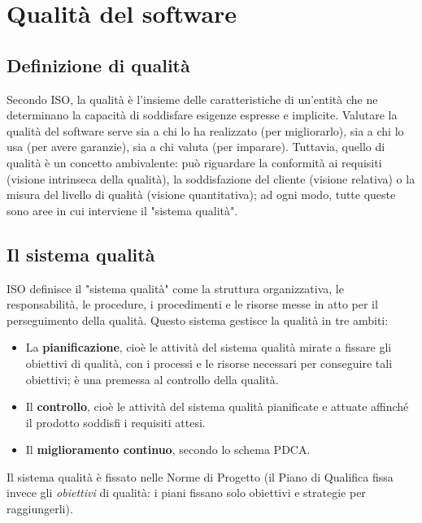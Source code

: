 \documentclass[a4paper]{article}
\begin{document}
		
	\section{Qualità del software}


		
	\subsection{Definizione di qualità}

		
Secondo ISO, la qualità è l'insieme delle caratteristiche di un'entità che ne determinano la capacità di soddisfare esigenze espresse e implicite. Valutare la qualità del software serve sia a chi lo ha realizzato (per migliorarlo), sia a chi lo usa (per avere garanzie), sia a chi valuta (per imparare). Tuttavia, quello di qualità è un concetto ambivalente: può riguardare la conformità ai requisiti (visione intrinseca della qualità), la soddisfazione del cliente (visione relativa) o la misura del livello di qualità (visione quantitativa); ad ogni modo, tutte queste sono aree in cui interviene il "sistema qualità".

		
	\subsection{Il sistema qualità}

		
ISO definisce il "sistema qualità" come la struttura organizzativa, le responsabilità, le procedure, i procedimenti e le risorse messe in atto per il perseguimento della qualità. Questo sistema gestisce la qualità in tre ambiti:
		
	\begin{itemize}
		
			
	\item La \textbf{pianificazione}, cioè le attività del sistema qualità mirate a fissare gli obiettivi di qualità, con i processi e le risorse necessari per conseguire tali obiettivi; è una premessa al controllo della qualità.
			
	\item Il \textbf{controllo}, cioè le attività del sistema qualità pianificate e attuate affinché il prodotto soddisfi i requisiti attesi.
			
	\item Il \textbf{miglioramento continuo}, secondo lo schema PDCA.
		
	\end{itemize}

		
Il sistema qualità è fissato nelle Norme di Progetto (il Piano di Qualifica fissa invece gli \emph{obiettivi} di qualità: i piani fissano solo obiettivi e strategie per raggiungerli).%
\end{document}
